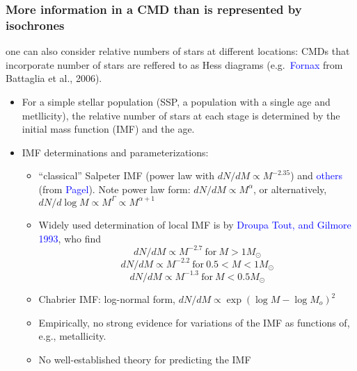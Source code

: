 \documentclass{article}
\begin{document}
  \subsubsection{More information in a CMD than is represented by isochrones}
  one can also consider relative numbers of stars at
      different locations: CMDs that incorporate number of stars are
      reffered to as Hess diagrams (e.g.\ \textcolor{blue}{Fornax}
      from Battaglia et al., 2006).
      \begin{itemize}
          \item For a simple stellar population (SSP, a population with
              a single age and metllicity), the relative number of stars
              at each stage is determined by the initial mass function (IMF)
              and the age.
          \item IMF determinations and parameterizations:
              \begin{itemize}
                  \item ``classical'' Salpeter IMF (power law with
                      $ dN/dM \propto M^{-2.35}$) and \textcolor{blue}{others}
                      (from \textcolor{blue}{Pagel}). Note power law form:
                      $ dN/dM \propto M^{\alpha}  $,
                      or alternatively,
                      $ dN/d\log{M} \propto M^{\Gamma} \propto M^{\alpha + 1} $
                  \item Widely used determination of local IMF is by
                      \textcolor{blue}{Droupa Tout, and Gilmore 1993}, who find
                      $$ dN/dM \propto M^{-2.7}\ \textrm{for}\ M > 1M_{\odot} $$
                      $$ dN/dM \propto M^{-2.2}\ \textrm{for}\ 0.5 < M < 1M_{\odot} $$
                      $$ dN/dM \propto M^{-1.3}\ \textrm{for}\ M < 0.5M_{\odot} $$
                  \item Chabrier IMF: log-normal form,
                      $ dN/dM \propto \exp(\log{M}-\log{M_o})^2  $
                  \item Empirically, no strong evidence for variations of the
                    IMF as functions of, e.g., metallicity.
                  \item No well-established theory for predicting the IMF
              \end{itemize}
      \end{itemize}
\end{document}

